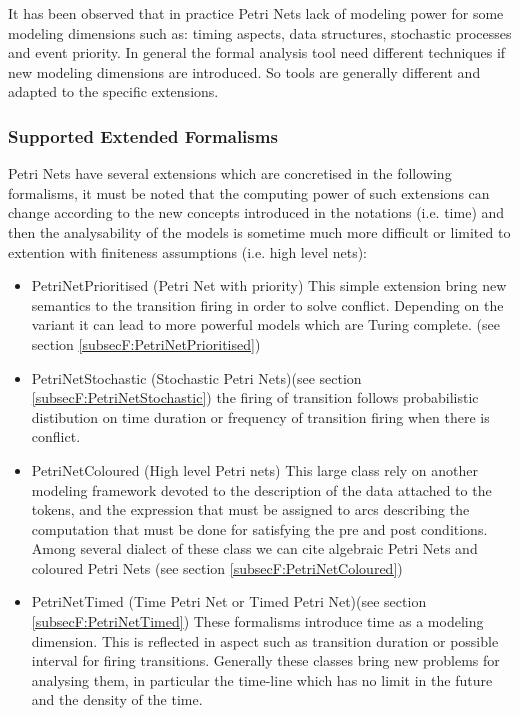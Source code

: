 It has been observed that in practice Petri Nets lack of modeling power for some modeling dimensions such as: timing aspects, data structures, stochastic processes and event priority. In general the formal analysis tool need different techniques if new modeling dimensions are introduced. So tools are generally different and adapted to the specific extensions.

\subsubsection{Supported Extended Formalisms}

Petri Nets have several extensions which are concretised in the following formalisms, it must be noted that the computing power of such extensions can change according to the new concepts introduced in the notations (i.e. time) and then the analysability of the models is sometime much more difficult or limited to extention with finiteness assumptions (i.e. high level nets):
\begin{itemize}
	\item PetriNetPrioritised (Petri Net with priority) This simple extension bring new semantics to the transition firing in order to solve conflict. Depending on the variant it can lead to more powerful models which are Turing complete. (see section \ref{subsecF:PetriNetPrioritised})	
	\item PetriNetStochastic (Stochastic Petri Nets)(see section \ref{subsecF:PetriNetStochastic}) the firing of transition follows probabilistic distibution on time duration or frequency of transition firing when there is conflict.
	\item PetriNetColoured (High level Petri nets) This large class rely on another modeling framework devoted to the description of the data attached to the tokens, and the expression that must be assigned to arcs describing the computation that must be done for satisfying the pre and post conditions. Among several dialect of these class we can cite algebraic Petri Nets and coloured Petri Nets (see section \ref{subsecF:PetriNetColoured})
	\item PetriNetTimed (Time Petri Net or Timed Petri Net)(see section \ref{subsecF:PetriNetTimed})
	These formalisms introduce time as a modeling dimension. This is reflected in aspect such as transition duration or possible interval for firing transitions. Generally these classes bring new problems for analysing them, in particular the time-line which has no limit in the future and the density of the time.
\end{itemize}


